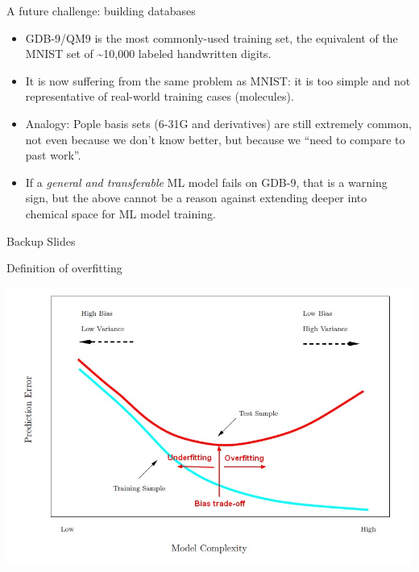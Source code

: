 \documentclass[compress]{beamer}
\begin{document}
\begin{frame}{A future challenge: building databases}
  \begin{itemize}
  \item GDB-9/QM9 is the most commonly-used training set, the equivalent of the MNIST set of \textasciitilde{}10,000 labeled handwritten digits.
  \item It is now suffering from the same problem as MNIST: it is too simple and not representative of real-world training cases (molecules).
  \item Analogy: Pople basis sets (6-31G and derivatives) are still extremely common, not even because we don't know better, but because we ``need to compare to past work''.
  \item If a \emph{general and transferable} ML model fails on GDB-9, that is a warning sign, but the above cannot be a reason against extending deeper into chemical space for ML model training.
  \end{itemize}
\end{frame}

\begin{frame}{Backup Slides}
\end{frame}

\begin{frame}{Definition of overfitting}
  \begin{center}
    \includegraphics[width=1.00\textwidth]{./figures/model_complexity_error_training_test.jpg}
  \end{center}
\end{frame}
\end{document}
